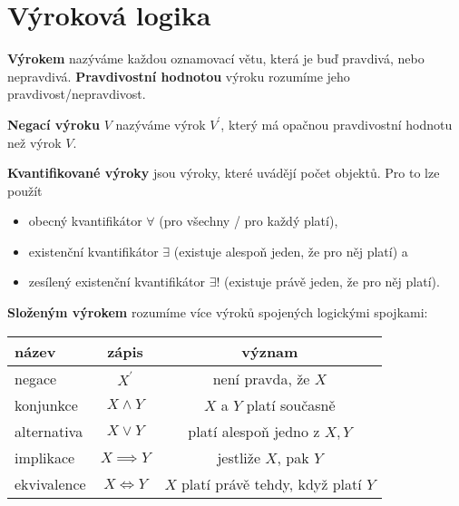 \section{Výroková logika}
\begin{definition}
  \textbf{Výrokem} nazýváme každou oznamovací větu, která je buď pravdivá, nebo nepravdivá. \textbf{Pravdivostní hodnotou} výroku rozumíme jeho pravdivost/nepravdivost.
\end{definition}

\begin{definition}
  \textbf{Negací výroku} $V$ nazýváme výrok $V^\prime$, který má opačnou pravdivostní hodnotu než výrok $V$.
\end{definition}

\begin{pozn}
  \textbf{Kvantifikované výroky} jsou výroky, které uvádějí počet objektů. Pro to lze použít
  \begin{itemize}
    \item obecný kvantifikátor $\forall$ (pro všechny / pro každý platí),
    \item existenční kvantifikátor $\exists$ (existuje alespoň jeden, že pro něj platí) a
    \item zesílený existenční kvantifikátor $\exists !$ (existuje právě jeden, že pro něj platí).
  \end{itemize}
\end{pozn}

\begin{definition}
  \textbf{Složeným výrokem} rozumíme více výroků spojených logickými spojkami:
  \begin{center}
    \begin{tabular}{l | c c}
      název & zápis & význam \\
      \hline
      negace & $X^\prime$ & není pravda, že $X$ \\
      konjunkce & $X\land Y$ & $X$ a $Y$ platí současně \\
      alternativa & $X\lor Y$ & platí alespoň jedno z $X,Y$\\
      implikace & $X\implies Y$ & jestliže $X$, pak $Y$\\
      ekvivalence & $X\iff Y$ & $X$ platí právě tehdy, když platí $Y$
    \end{tabular}
  \end{center}
\end{definition}


